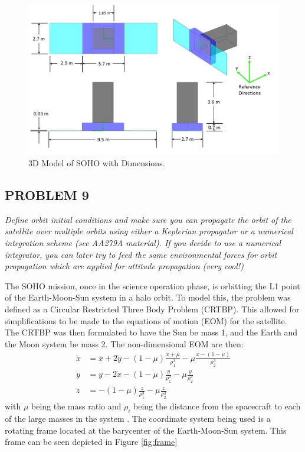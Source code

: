 \documentclass[12pt,a4paper,notitlepage]{article}
\begin{document}
\begin{figure}[H]
  \centering
    \includegraphics[width=\textwidth]{Images/SOHO_dim.JPG}
  \caption{3D Model of SOHO with Dimensions.}
  \label{fig:SOHO_dim}
\end{figure}

\subsection{PROBLEM 9}
\textit{Define orbit initial conditions and make sure you can propagate the orbit of the satellite over multiple orbits using either a Keplerian propagator or a numerical integration scheme (see AA279A material). If you decide to use a numerical integrator, you can later try to feed the same environmental forces for orbit propagation which are applied for attitude propagation (very cool!)}

The SOHO mission, once in the science operation phase, is orbitting the L1 point of the Earth-Moon-Sun system in a halo orbit. To model this, the problem was defined as a Circular Restricted Three Body Problem (CRTBP). This allowed for simplifications to be made to the equations of motion (EOM) for the satellite. The CRTBP was then formulated to have the Sun be mass 1, and the Earth and the Moon system be mass 2. The non-dimensional EOM are then:
\begin{equation}
\begin{aligned}
    \ddot{x} &= x + 2\dot{y} - (1-\mu)\frac{x+\mu}{\rho_{1}^{3}}-\mu\frac{x-(1-\mu)}{\rho_{2}^{3}}\\
    \ddot{y} &= y - 2\dot{x} - (1-\mu)\frac{y}{\rho_{1}^{3}}-\mu\frac{y}{\rho_{2}^{3}}\\
    \ddot{z} &= -(1-\mu)\frac{z}{\rho_{1}^{3}} - \mu\frac{z}{\rho_{2}^{3}}
\end{aligned}
\end{equation}
with \(\mu\) being the mass ratio and \(\rho_{i}\) being the distance from the spacecraft to each of the large masses in the system \cite{CRTBP}. The coordinate system being used is a rotating frame located at the barycenter of the Earth-Moon-Sun system. This frame can be seen depicted in Figure \ref{fig:frame}
\end{document}

